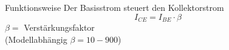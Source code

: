 \begin{frame}
\begin{minipage}{0.55\textwidth}
\begin{center}
{\begin{figure}
      \end{figure}
      }
    \end{center}
  \end{minipage}
  \begin{minipage}{0.4\textwidth}
    \begin{center}
      \begin{block}{Funktionsweise}
        Der Basisstrom steuert den Kollektorstrom
        $$I_{CE} = I_{BE} \cdot \beta$$
        $\beta = $ Verstärkungsfaktor \\ (Modellabhängig $\beta = 10-900$)
      \end{block}
    \end{center}
  \end{minipage}
\end{frame}


